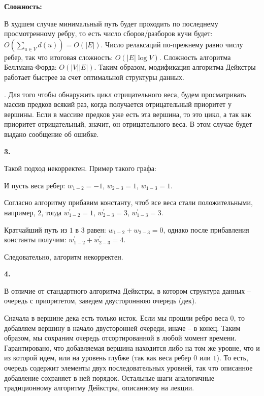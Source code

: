 \documentclass[12pt]{extreport}
\begin{document}
\bigskip 
{\bf Сложность:} 

В худшем случае минимальный путь будет проходить по последнему просмотренному ребру, то есть число сборов/разборов кучи будет: $O(\sum_{u \in V} d(u)) = O(|E|)$. Число релаксаций по-прежнему равно числу ребер, так что итоговая сложность: $O(|E| \log V)$. Сложность алгоритма Беллмана-Форда: $O(|V||E|)$. Таким образом, модификация алгоритма Дейкстры работает быстрее за счет оптимальной структуры данных.


. Для того чтобы обнаружить цикл отрицательного веса, будем просматривать массив предков всякий раз, когда получается отрицательный приоритет у вершины. Если в массиве предков уже есть эта вершина, то это цикл, а так как приоритет отрицательный, значит, он отрицательного веса. В этом случае будет выдано сообщение об ошибке.

\bigskip 
{\bf 3.} 

Такой подход некорректен. Пример такого графа: 


И пусть веса ребер: $w_{1-2} = -1$, $w_{2-3} = 1$, $w_{1-3}=1$.

Согласно алгоритму прибавим константу, чтоб все веса стали положительными, например, $2$, тогда $w_{1-2} ^{'}= 1$, $w_{2-3}^{'} = 3$, $w_{1-3}^{'}=3$. 

Кратчайший путь из $1$ в $3$ равен: $w_{1-2} + w_{2-3} = 0$, однако после прибавления константы получим: $w_{1-2}^{'} + w_{2-3}^{'} = 4$. 

Следовательно, алгоритм некорректен.

\bigskip 
{\bf 4.} 

В отличие от стандартного алгоритма Дейкстры, в котором структура данных -- очередь с приоритетом, заведем двустороннюю очередь (дек).  

Сначала в вершине дека есть только исток. Если мы прошли ребро веса $0$, то добавляем вершину в начало двусторонней очереди, иначе -- в конец. Таким образом, мы сохраним очередь отсортированной в любой момент времени. Гарантировано, что добавляемая вершина находится либо на том же уровне, что и из которой идем, или на уровень глубже (так как веса ребер $0 $ или $1$). То есть, очередь содержит элементы двух последовательных уровней, так что описанное добавление сохраняет в ней порядок. Остальные шаги аналогичные традиционному алгоритму Дейкстры, описанному на лекции.
\end{document}
